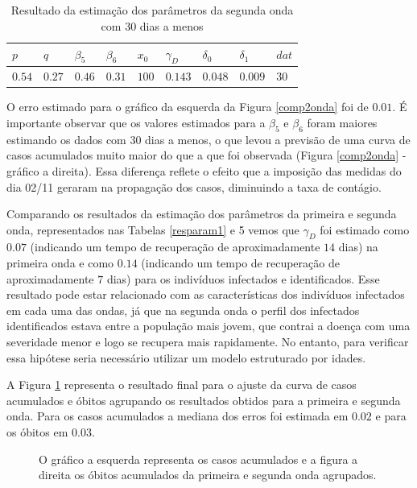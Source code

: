 \documentclass[12pt]{article}
\begin{document}
\begin{table}[h!]
\label{Tabcomp2onda}
\centering
\begin{small}
\caption{Resultado da estimação dos parâmetros da segunda onda com 30 dias a menos}
\begin{tabular}{|p{1.5cm}|p{1.5cm}|p{1.5cm}|p{1.5cm}|p{1.5cm}|p{1.5cm}|p{1.5cm}|p{1.5cm}|p{1.5cm}|}
\hline
 $p$ & $q$ & $\beta_5$ & $\beta_6$ & $x_0$ & $\gamma_D$ & $\delta_0$ & $\delta_1$ & $dat$\\
\hline
 $0.54$& $0.27$& $0.46$ & $0.31$ & $100$ & $0.143$ & $0.048$ & $0.009$ & $30$ \\
\hline
\end{tabular}
\end{small}
\end{table}



O erro estimado para o gráfico da esquerda  da Figura \ref{comp2onda} 
foi de $0.01$. É importante observar que os valores estimados para a $\beta_5$ e $\beta_6$ foram maiores estimando os dados com 30 dias a menos, o que levou a previsão de uma curva de casos acumulados muito maior do que a que foi observada (Figura \ref{comp2onda} - gráfico a direita). Essa diferença reflete o efeito que a imposição das medidas do dia 02/11 geraram na propagação dos casos, diminuindo a taxa de contágio. 


Comparando os resultados da estimação dos parâmetros da primeira e segunda onda, representados nas Tabelas \ref{resparam1} e 5 vemos que $\gamma_D$ foi estimado como $0.07$ (indicando um tempo de recuperação de aproximadamente $14$ dias) na primeira onda e como $0.14$ (indicando um tempo de recuperação de aproximadamente $7$ dias) para os indivíduos infectados e identificados. Esse resultado pode estar relacionado com as características dos indivíduos infectados em cada uma das ondas, já que na segunda onda o perfil dos infectados identificados estava entre a população mais jovem, que contrai a doença com uma severidade menor e logo se recupera mais rapidamente. No entanto, para verificar essa hipótese seria necessário utilizar um modelo estruturado por idades. 

A Figura \ref{resfinal} representa o resultado final para o ajuste da curva de casos acumulados e óbitos agrupando os resultados obtidos para a primeira e segunda onda. Para os casos acumulados a mediana dos erros foi estimada em $0.02$ e para os óbitos em $0.03$.
\begin{figure}[h!]
    \centering
    
    
    \caption{O gráfico a esquerda representa os casos acumulados e a figura a direita os óbitos acumulados da primeira e segunda onda agrupados.}
    \label{resfinal}
\end{figure}
\end{document}
